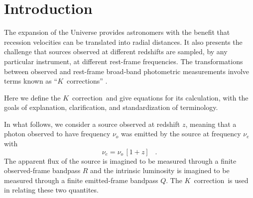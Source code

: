 \documentclass[preprint]{aastex}
\newcommand{\kcorrection}{$K$~correction}
\newcommand{\kcorrections}{{\kcorrection}s}
\newcommand{\nuobs}{\nu_o}
\newcommand{\nuemit}{\nu_e}
\begin{document}
\title{\scalebox{1.5}{The \kcorrection}}
\author{
  David W. Hogg,
  Ivan K. Baldry,
  Michael Blanton,
  and
  Daniel J. Eisenstein
  \\ \textsl{seventh draft---2002 October 14}
}

\begin{abstract}
The \kcorrection\ ``corrects'' for the fact that sources observed at
different redshifts are, in general, compared with standards or each
other at different rest-frame wavelengths.  It is part of the relation
between the emitted- or rest-frame absolute magnitude of a source in
one broad photometric bandpass to the observed-frame apparent
magnitude of the same source in another broad bandpass.  This short
pedagogical paper provides definitions of and equations for the
\kcorrection.
\end{abstract}

\section{Introduction}

The expansion of the Universe provides astronomers with the benefit
that recession velocities can be translated into radial distances.  It
also presents the challenge that sources observed at different
redshifts are sampled, by any particular instrument, at different
rest-frame frequencies.  The transformations between observed and
rest-frame broad-band photometric measurements involve terms known as
``\kcorrections'' \citep*{humason56a, oke68a}.

Here we define the \kcorrection\ and give equations for its
calculation, with the goals of explanation, clarification, and
standardization of terminology.

In what follows, we consider a source observed at redshift $z$,
meaning that a photon observed to have frequency $\nuobs$ was emitted
by the source at frequency $\nuemit$ with
\begin{equation}
\nuemit = \nuobs\,[1+z] \;\;\;.
\end{equation}
The apparent flux of the source is imagined to be measured through a
finite observed-frame bandpass $R$ and the intrinsic luminosity is
imagined to be measured through a finite emitted-frame bandpass $Q$.
The \kcorrection\ is used in relating these two quantites.
\end{document}
